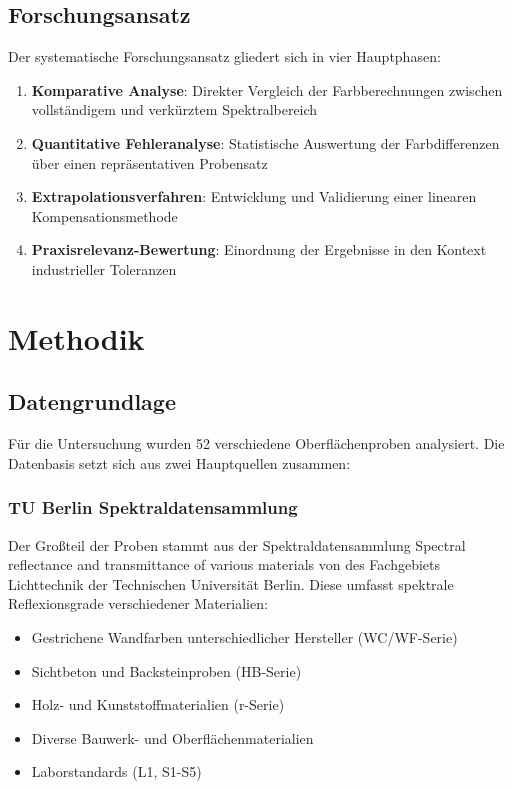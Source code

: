 \subsection{Forschungsansatz}

Der systematische Forschungsansatz gliedert sich in vier Hauptphasen:
\begin{enumerate}
    \item \textbf{Komparative Analyse}: Direkter Vergleich der Farbberechnungen zwischen vollständigem und verkürztem Spektralbereich
    \item \textbf{Quantitative Fehleranalyse}: Statistische Auswertung der Farbdifferenzen über einen repräsentativen Probensatz
    \item \textbf{Extrapolationsverfahren}: Entwicklung und Validierung einer linearen Kompensationsmethode
    \item \textbf{Praxisrelevanz-Bewertung}: Einordnung der Ergebnisse in den Kontext industrieller Toleranzen
\end{enumerate}

\section{Methodik}

\subsection{Datengrundlage}

Für die Untersuchung wurden 52 verschiedene Oberflächenproben analysiert. Die Datenbasis setzt sich aus zwei Hauptquellen zusammen:

\subsubsection{TU Berlin Spektraldatensammlung}

Der Großteil der Proben stammt aus der Spektraldatensammlung \glqq{}Spectral reflectance and transmittance of various materials\grqq{} von \textcite{RudawskiDataset2021} des Fachgebiets Lichttechnik der Technischen Universität Berlin. Diese umfasst spektrale Reflexionsgrade verschiedener Materialien:
\begin{itemize}
    \item Gestrichene Wandfarben unterschiedlicher Hersteller (WC/WF-Serie)
    \item Sichtbeton und Backsteinproben (HB-Serie) 
    \item Holz- und Kunststoffmaterialien (r-Serie)
    \item Diverse Bauwerk- und Oberflächenmaterialien
    \item Laborstandards (L1, S1-S5)
\end{itemize}

